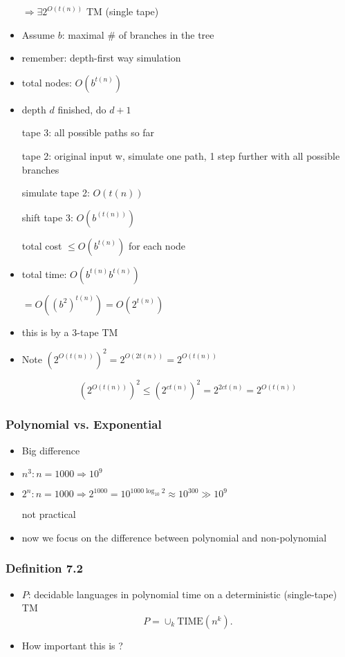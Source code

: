 \begin{frame}[allowframebreaks]
\begin{itemize}
$\Rightarrow \exists 2^{O(t(n))}$ TM (single tape)
\item Assume $b$: maximal \# of branches in the tree
\item remember: depth-first way simulation
\item total nodes: $O(b^{t(n)})$
\item depth $d$ finished, do $d+1$

tape 3: all possible paths so far

tape 2: original input w, simulate one path, 1 step further
with all possible branches

simulate tape 2: $O(t(n))$

shift tape 3: $O(b^{(t(n))})$

total cost $\leq O(b^{t(n)})$ for each node
\item total time: $O(b^{t(n)}b^{t(n)})$

$=O((b^2)^{t(n)} )
= O(2^{t(n)})$


\item this is by a 3-tape TM
\item Note $(2^{O(t(n))})^2
= 2^{O(2t(n))}
= 2^{O(t(n))}$

\begin{equation*}
  (2^{O(t(n))})^2
\leq (2^{ct(n)})^2
= 2^{2ct(n)} 
= 2^{O(t(n))}
\end{equation*}

\end{itemize}\end{frame} \begin{frame}[allowframebreaks] \frametitle{Polynomial vs. Exponential}
  \begin{itemize}
\item Big difference
\item $n^3: n = 1000 \Rightarrow 10^9$
\item $2^n: n = 1000 \Rightarrow 2^{1000}
=10^{1000\log_{10}2}
\approx
10^{300}
\gg 10^9$

not practical
\item now we focus on the difference between polynomial
and non-polynomial
\end{itemize}\end{frame} \begin{frame}[allowframebreaks] \frametitle{Definition 7.2}
  \begin{itemize}
\item $P$: decidable languages in polynomial time
on a deterministic (single-tape) TM
\begin{equation*}
  P=\cup_k
\text{TIME}(n^k).
\end{equation*}
\item How important this is ?


\end{itemize}
\end{frame}
